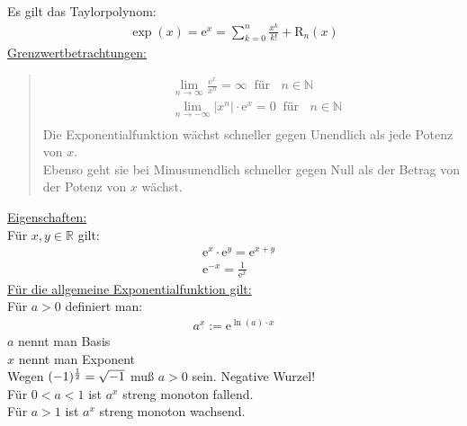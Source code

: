 Es gilt das Taylorpolynom:\\
\begin{align*}
\exp(x)=\mathrm{e}^x=\sum\limits_{k=0}^{n}\frac{x^k}{k!}+\mathrm{R}_n(x)
\end{align*}
\underline {Grenzwertbetrachtungen:}
\begin{quote}
	\begin{align*}
	&\lim\limits_ {n\to\infty}\frac{\mathrm{e}^x}{x^n}=\infty\;\;\text{für }\;\;n\in\mathbb{N}\\
	&\lim\limits_ {n\to-\infty}|x^n|\cdot\mathrm{e}^x=0\;\;\text{für }\;\;n\in\mathbb{N}\\
	\end{align*}
	Die Exponentialfunktion wächst schneller gegen Unendlich als jede Potenz von $ x $.\\
	Ebenso geht sie bei Minusunendlich schneller gegen Null als der Betrag von der Potenz von $ x $ wächst.\\
\end{quote}
\underline{Eigenschaften:}\\
Für $ x,y\in\mathbb{R} $ gilt:\\
\begin{align*}
&\mathrm{e}^x\cdot \mathrm{e}^y=\mathrm{e}^{x+y}\\
&\mathrm{e}^{-x}=\frac{1}{\mathrm{e}^x}
\end{align*}
\underline{Für die allgemeine Exponentialfunktion gilt:}\\
Für $ a>0  $ definiert man:\\
\begin{align*}
a^x:=\mathrm{e}^{\ln(a)\cdot x}
\end{align*}
$ a $ nennt man Basis\\
$ x $ nennt man Exponent\\
Wegen $ (-1)^{\genfrac{}{}{}{2}{1 }{2 }} =\sqrt{-1}$ muß $ a>0 $ sein. Negative Wurzel! \\
Für $ 0<a<1 $ ist $ a^x $ streng monoton fallend.\\
Für $ a>1 $ ist $ a^x $ streng monoton wachsend.\\
